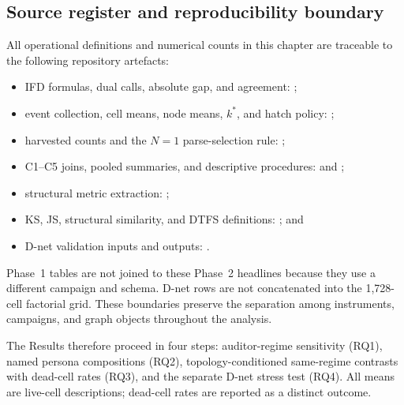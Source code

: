 \subsection{Source register and reproducibility boundary}
\label{sec:mm-sources}

All operational definitions and numerical counts in this chapter are traceable to the
following repository artefacts:
\begin{itemize}
  \item IFD formulas, dual calls, absolute gap, and agreement:
        ;
  \item event collection, cell means, node means, \(k^{*}\), and hatch policy:
        ;
  \item harvested counts and the \(N=1\) parse-selection rule:
        ;
  \item C1--C5 joins, pooled summaries, and descriptive procedures:
         and
        ;
  \item structural metric extraction:
        ;
  \item KS, JS, structural similarity, and DTFS definitions:
        ; and
  \item D-net validation inputs and outputs:
        .
\end{itemize}
Phase~1 tables are not joined to these Phase~2 headlines because they use a different
campaign and schema.  D-net rows are not concatenated into the 1,728-cell factorial
grid.  These boundaries preserve the separation among instruments, campaigns, and
graph objects throughout the analysis.

The Results therefore proceed in four steps: auditor-regime sensitivity
(RQ1), named persona compositions (RQ2), topology-conditioned same-regime
contrasts with dead-cell rates (RQ3), and the separate D-net stress test
(RQ4). All means are live-cell descriptions; dead-cell rates are reported as
a distinct outcome.
\fussy
